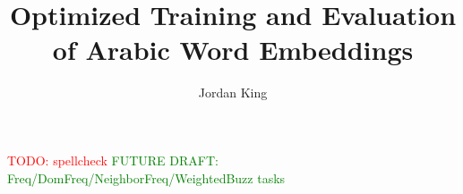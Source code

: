 \documentclass[12pt]{report}
\title{Optimized Training and Evaluation of Arabic Word Embeddings}
\author{Jordan King}
\begin{document}
\maketitle   

\textcolor{red}{TODO: spellcheck}
\textcolor{green}{FUTURE DRAFT: Freq/DomFreq/NeighborFreq/WeightedBuzz tasks}



\tableofcontents
\listoffigures 
\listoftables  

\newpage
{}  %








% 
% 






% 

\end{document}
